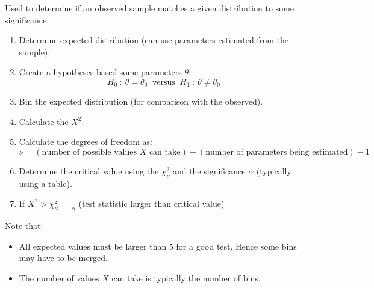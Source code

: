 Used to determine if an observed sample matches a given distribution to some significance.
\begin{enumerate}
	\item Determine expected distribution (can use parameters estimated from the sample).
	\item Create a hypotheses based some parameters $\theta$: {
	      \[H_0 \ : \ \theta = \theta_0 \ \text{  versus  } \ H_1 \ : \ \theta \neq \theta_0\]
	      }
	\item Bin the expected distribution (for comparison with the observed).
	\item Calculate the  $X^2$.
	\item Calculate the degrees of freedom as: {
	      \[\nu = (\text{number of possible values $X$ can take}) - (\text{number of parameters being estimated}) - 1\]}
	\item Determine the critical value using the  $\chi^2_\nu$ and the significance $\alpha$ (typically using a table).
	\item If $X^2 > \chi^2_{\nu, \ 1 - \alpha}$ (test statistic larger than critical value)
\end{enumerate}
Note that:
\begin{itemize}
	\item All expected values must be larger than $5$ for a good test. Hence some bins may have to be merged.
	\item The number of values $X$ can take is typically the number of bins.
\end{itemize}


